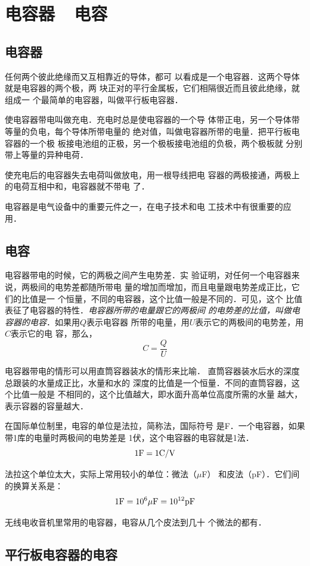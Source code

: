 \section{电容器~~电容}
\subsection{电容器}
任何两个彼此绝缘而又互相靠近的导体，都可
以看成是一个电容器．这两个导体就是电容器的两个极，两
块正对的平行金属板，它们相隔很近而且彼此绝缘，就组成一
个最简单的电容器，叫做平行板电容器．

使电容器带电叫做充电．充电时总是使电容器的一个导
体带正电，另一个导体带等量的负电，每个导体所带电量的
绝对值，叫做电容器所带的电量．把平行板电容器的一个极
板接电池组的正极，另一个极板接电池组的负极，两个极板就
分别带上等量的异种电荷．

使充电后的电容器失去电荷叫做放电，用一根导线把电
容器的两极接通，两极上的电荷互相中和，电容器就不带电
了．

电容器是电气设备中的重要元件之一，在电子技术和电
工技术中有很重要的应用．

\subsection{电容}
电容器带电的时候，它的两极之间产生电势差．实
验证明，对任何一个电容器来说，两极间的电势差都随所带电
量的增加而增加，而且电量跟电势差成正比，它们的比值是一
个恒量，不同的电容器，这个比值一般是不同的．可见，这个
比值表征了电容器的特性．\textit{电容器所带的电量跟它的两极间
的电势差的比值，叫做电容器的电容}．如果用$Q$表示电容器
所带的电量，用$U$表示它的两极间的电势差，用$C$表示它的电
容，那么，
\[C=\frac{Q}{U} \]

电容器带电的情形可以用直筒容器装水的情形来比喻．
直筒容器装水后水的深度总跟装的水量成正比，水量和水的
深度的比值是一个恒量．不同的直筒容器，这个比值一般是
不相同的，这个比值越大，即水面升高单位高度所需的水量
越大，表示容器的容量越大．

在国际单位制里，电容的单位是法拉，简称法，国际符号
是F．一个电容器，如果带1库的电量时两极间的电势差是
1伏，这个电容器的电容就是1法．
\[1{\rm F}=1{\rm C}/{\rm V}\]

法拉这个单位太大，实际上常用较小的单位：微法（$\mu$F）
和皮法（pF）．它们间的换算关系是：
\[1{\rm F}=10^6\mu{\rm F}=10^{12}{\rm pF}\]

无线电收音机里常用的电容器，电容从几个皮法到几十
个微法的都有．

\subsection{平行板电容器的电容}


